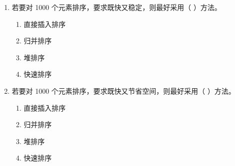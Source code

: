 \documentclass[12pt, a4paper]{article}
\begin{document}
\begin{enumerate}
    \item 若要对 1000 个元素排序，要求既快又稳定，则最好采用（ ）方法。
    \begin{enumerate}
        \item[A.] 直接插入排序
        \item[B.] 归并排序
        \item[C.] 堆排序
        \item[D.] 快速排序
    \end{enumerate}
    
    \item 若要对 1000 个元素排序，要求既快又节省空间，则最好采用（ ）方法。
    \begin{enumerate}
        \item[A.] 直接插入排序
        \item[B.] 归并排序
        \item[C.] 堆排序
        \item[D.] 快速排序
    \end{enumerate}
\end{enumerate}
\end{document}
